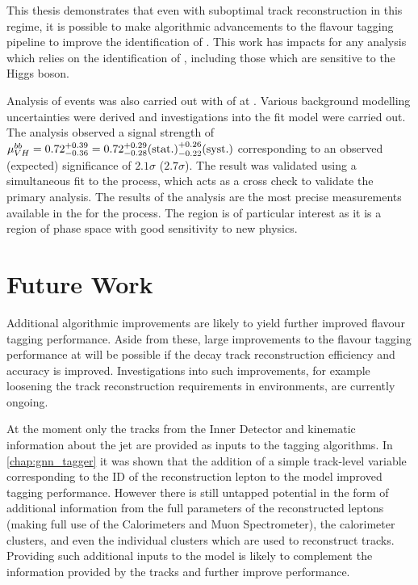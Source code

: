 This thesis demonstrates that even with suboptimal track reconstruction in this regime, it is possible to make algorithmic advancements to the flavour tagging pipeline to improve the identification of \bjets.
This work has impacts for any analysis which relies on the identification of \bjets, including those which are sensitive to the Higgs boson.

Analysis of \VHbb events was also carried out with \intlumi of \runtwo \ATLAS at .
Various background modelling uncertainties were derived and investigations into the fit model were carried out.
The analysis observed a signal strength of 
$\mu_{VH}^{bb} = 0.72 ^{+0.39}_{-0.36} = 0.72 ^{+0.29}_{-0.28} \mathrm{(stat.)} ^{+0.26}_{-0.22} \mathrm{(syst.)}$
corresponding to an observed (expected) significance of $2.1\sigma$ ($2.7\sigma$).
The result was validated using a simultaneous fit to the \VZbb process, which acts as a cross check to validate the primary analysis.
The results of the analysis are the most precise measurements available in the \highpt for the \VHbb process.
The \highpt region is of particular interest as it is a region of phase space with good sensitivity to new physics.


\section{Future Work}\label{sec:conc-future}

Additional algorithmic improvements are likely to yield further improved flavour tagging performance.
Aside from these, large improvements to the flavour tagging performance at \highpt will be possible if the \bhadron decay track reconstruction efficiency and accuracy is improved.
Investigations into such improvements, for example loosening the track reconstruction requirements in \highpt environments, are currently ongoing.

At the moment only the tracks from the Inner Detector and kinematic information about the jet are provided as inputs to the tagging algorithms.
In \cref{chap:gnn_tagger} it was shown that the addition of a simple track-level variable corresponding to the ID of the reconstruction lepton to the model improved tagging performance.
However there is still untapped potential in the form of additional information from the full parameters of the reconstructed leptons (making full use of the Calorimeters and Muon Spectrometer), the calorimeter clusters, and even the individual clusters which are used to reconstruct tracks.
Providing such additional inputs to the model is likely to complement the information provided by the tracks and further improve performance.

